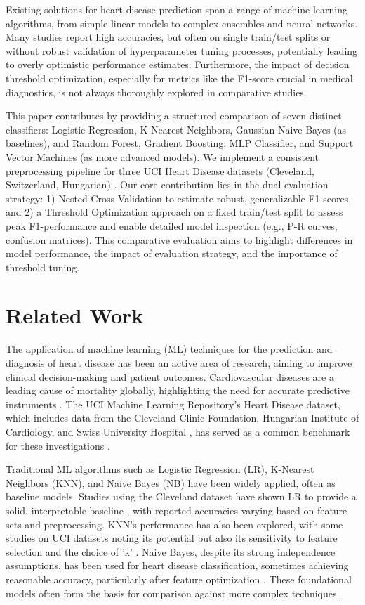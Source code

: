 \documentclass{article}
\begin{document}
Existing solutions for heart disease prediction span a range of machine learning algorithms, from simple linear models to complex ensembles and neural networks. Many studies report high accuracies, but often on single train/test splits or without robust validation of hyperparameter tuning processes, potentially leading to overly optimistic performance estimates. Furthermore, the impact of decision threshold optimization, especially for metrics like the F1-score crucial in medical diagnostics, is not always thoroughly explored in comparative studies.

This paper contributes by providing a structured comparison of seven distinct classifiers: Logistic Regression, K-Nearest Neighbors, Gaussian Naive Bayes (as baselines), and Random Forest, Gradient Boosting, MLP Classifier, and Support Vector Machines (as more advanced models). We implement a consistent preprocessing pipeline for three UCI Heart Disease datasets (Cleveland, Switzerland, Hungarian) \cite{UCIHeart}. Our core contribution lies in the dual evaluation strategy: 1) Nested Cross-Validation to estimate robust, generalizable F1-scores, and 2) a Threshold Optimization approach on a fixed train/test split to assess peak F1-performance and enable detailed model inspection (e.g., P-R curves, confusion matrices). This comparative evaluation aims to highlight differences in model performance, the impact of evaluation strategy, and the importance of threshold tuning.

\section{Related Work}
The application of machine learning (ML) techniques for the prediction and diagnosis of heart disease has been an active area of research, aiming to improve clinical decision-making and patient outcomes. Cardiovascular diseases are a leading cause of mortality globally, highlighting the need for accurate predictive instruments \cite{Alkhodari2025}. The UCI Machine Learning Repository's Heart Disease dataset, which includes data from the Cleveland Clinic Foundation, Hungarian Institute of Cardiology, and Swiss University Hospital \cite{UCIHeart}, has served as a common benchmark for these investigations \cite{Jada2024}.

Traditional ML algorithms such as Logistic Regression (LR), K-Nearest Neighbors (KNN), and Naive Bayes (NB) have been widely applied, often as baseline models. Studies using the Cleveland dataset have shown LR to provide a solid, interpretable baseline \cite{Paul2021}, with reported accuracies varying based on feature sets and preprocessing. KNN's performance has also been explored, with some studies on UCI datasets noting its potential but also its sensitivity to feature selection and the choice of 'k' \cite{Nasution2025eval}. Naive Bayes, despite its strong independence assumptions, has been used for heart disease classification, sometimes achieving reasonable accuracy, particularly after feature optimization \cite{Firdaus2024}. These foundational models often form the basis for comparison against more complex techniques.
\end{document}
